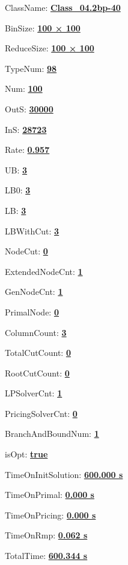 \documentclass[11pt]{article}
\begin{document}
\pagestyle{empty}


ClassName: \underline{\textbf{Class_04.2bp-40}}
\par
BinSize: \underline{\textbf{100 × 100}}
\par
ReduceSize: \underline{\textbf{100 × 100}}
\par
TypeNum: \underline{\textbf{98}}
\par
Num: \underline{\textbf{100}}
\par
OutS: \underline{\textbf{30000}}
\par
InS: \underline{\textbf{28723}}
\par
Rate: \underline{\textbf{0.957}}
\par
UB: \underline{\textbf{3}}
\par
LB0: \underline{\textbf{3}}
\par
LB: \underline{\textbf{3}}
\par
LBWithCut: \underline{\textbf{3}}
\par
NodeCut: \underline{\textbf{0}}
\par
ExtendedNodeCnt: \underline{\textbf{1}}
\par
GenNodeCnt: \underline{\textbf{1}}
\par
PrimalNode: \underline{\textbf{0}}
\par
ColumnCount: \underline{\textbf{3}}
\par
TotalCutCount: \underline{\textbf{0}}
\par
RootCutCount: \underline{\textbf{0}}
\par
LPSolverCnt: \underline{\textbf{1}}
\par
PricingSolverCnt: \underline{\textbf{0}}
\par
BranchAndBoundNum: \underline{\textbf{1}}
\par
isOpt: \underline{\textbf{true}}
\par
TimeOnInitSolution: \underline{\textbf{600.000 s}}
\par
TimeOnPrimal: \underline{\textbf{0.000 s}}
\par
TimeOnPricing: \underline{\textbf{0.000 s}}
\par
TimeOnRmp: \underline{\textbf{0.062 s}}
\par
TotalTime: \underline{\textbf{600.344 s}}
\par
\newpage
\end{document}
